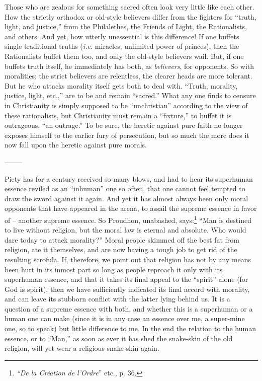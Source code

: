 Those who are zealous for something sacred often look very little like each 
other. How the strictly orthodox or old-style believers differ from the 
fighters for ``truth, light, and justice,'' from the Philalethes, the 
Friends of Light, the Rationalists, and others. And yet, how utterly 
unessential is this difference! If one buffets single traditional truths 
(\textit{i.e.} miracles, unlimited power of princes), then the Rationalists 
buffet them too, and only the old-style believers wail. But, if one buffets 
truth itself, he immediately has both, as \textit{believers}, for opponents. 
So with moralities; the strict believers are relentless, the clearer heads are 
more tolerant. But he who attacks morality itself gets both to deal with. 
``Truth, morality, justice, light, etc.,'' are to be and remain 
``sacred.'' What any one finds to censure in Christianity is simply supposed 
to be ``unchristian'' according to the view of these rationalists, but 
Christianity must remain a ``fixture,'' to buffet it is outrageous, ``an 
outrage.'' To be sure, the heretic against pure faith no longer exposes 
himself to the earlier fury of persecution, but so much the more does it now 
fall upon the heretic against pure morals.

\begin{center}
--------\end{center}


Piety has for a century received so many blows, and had to hear its superhuman 
essence reviled as an ``inhuman'' one so often, that one cannot feel tempted 
to draw the sword against it again. And yet it has almost always been only 
moral opponents that have appeared in the arena, to assail the supreme essence 
in favor of -- another supreme essence. So Proudhon, unabashed, 
says:\footnote{\textit{``De la Cr\'eation de l'Ordre}'' etc., p. 36.} ``Man 
is destined to live without religion, but the moral law is eternal and 
absolute. Who would dare today to attack morality?'' Moral people skimmed off 
the best fat from religion, ate it themselves, and are now having a tough job 
to get rid of the resulting scrofula. If, therefore, we point out that 
religion has not by any means been hurt in its inmost part so long as people 
reproach it only with its superhuman essence, and that it takes its final 
appeal to the ``spirit'' alone (for God is spirit), then we have 
sufficiently indicated its final accord with morality, and can leave its 
stubborn conflict with the latter lying behind us. It is a question of a 
supreme essence with both, and whether this is a superhuman or a human one can 
make (since it is in any case an essence over me, a super-mine one, so to 
speak) but little difference to me. In the end the relation to the human 
essence, or to ``Man,'' as soon as ever it has shed the snake-skin of the 
old religion, will yet wear a religious snake-skin again.


